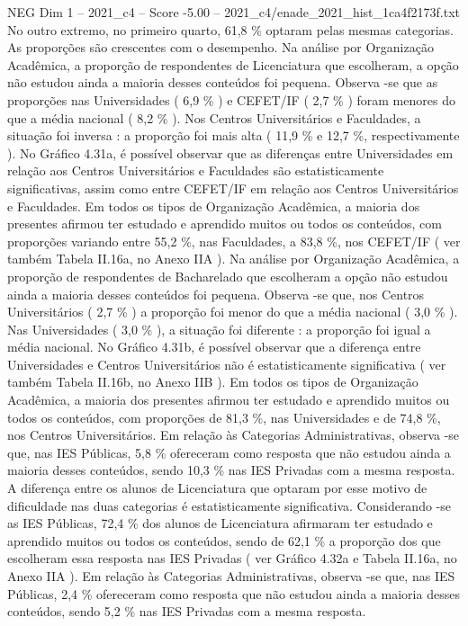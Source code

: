 \begin{textsample}{NEG Dim 1 – 2021\_c4 – Score -5.00 – 2021\_c4/enade\_2021\_hist\_1ca4f2173f.txt}
No outro extremo, no primeiro quarto, 61,8 \% optaram pelas mesmas categorias.
As proporções são crescentes com o desempenho.
Na análise por Organização Acadêmica, a proporção de respondentes de Licenciatura que escolheram, a opção não estudou ainda a maioria desses conteúdos foi pequena.
Observa -se que as proporções nas Universidades ( 6,9 \% ) e CEFET/IF ( 2,7 \% ) foram menores do que a média nacional ( 8,2 \% ).
Nos Centros Universitários e Faculdades, a situação foi inversa : a proporção foi mais alta ( 11,9 \% e 12,7 \%, respectivamente ).
No Gráfico 4.31a, é possível observar que as diferenças entre Universidades em relação aos Centros Universitários e Faculdades são estatisticamente significativas, assim como entre CEFET/IF em relação aos Centros Universitários e Faculdades.
Em todos os tipos de Organização Acadêmica, a maioria dos presentes afirmou ter estudado e aprendido muitos ou todos os conteúdos, com proporções variando entre 55,2 \%, nas Faculdades, a 83,8 \%, nos CEFET/IF ( ver também Tabela II.16a, no Anexo IIA ).
Na análise por Organização Acadêmica, a proporção de respondentes de Bacharelado que escolheram a opção não estudou ainda a maioria desses conteúdos foi pequena.
Observa -se que, nos Centros Universitários ( 2,7 \% ) a proporção foi menor do que a média nacional ( 3,0 \% ).
Nas Universidades ( 3,0 \% ), a situação foi diferente : a proporção foi igual a média nacional.
No Gráfico 4.31b, é possível observar que a diferença entre Universidades e Centros Universitários não é estatisticamente significativa ( ver também Tabela II.16b, no Anexo IIB ).
Em todos os tipos de Organização Acadêmica, a maioria dos presentes afirmou ter estudado e aprendido muitos ou todos os conteúdos, com proporções de 81,3 \%, nas Universidades e de 74,8 \%, nos Centros Universitários.
Em relação às Categorias Administrativas, observa -se que, nas IES Públicas, 5,8 \% ofereceram como resposta que não estudou ainda a maioria desses conteúdos, sendo 10,3 \% nas IES Privadas com a mesma resposta.
A diferença entre os alunos de Licenciatura que optaram por esse motivo de dificuldade nas duas categorias é estatisticamente significativa.
Considerando -se as IES Públicas, 72,4 \% dos alunos de Licenciatura afirmaram ter estudado e aprendido muitos ou todos os conteúdos, sendo de 62,1 \% a proporção dos que escolheram essa resposta nas IES Privadas ( ver Gráfico 4.32a e Tabela II.16a, no Anexo IIA ).
Em relação às Categorias Administrativas, observa -se que, nas IES Públicas, 2,4 \% ofereceram como resposta que não estudou ainda a maioria desses conteúdos, sendo 5,2 \% nas IES Privadas com a mesma resposta.

\end{textsample}
